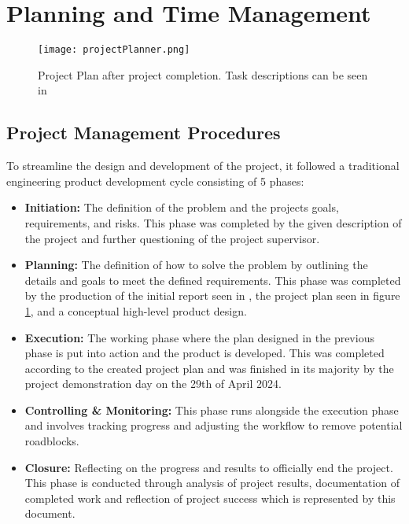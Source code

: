 \section{Planning and Time Management}
\begin{figure}[H]
	\centering
	\texttt{[image: projectPlanner.png]}
	\caption{Project Plan after project completion. Task descriptions can be seen in }
	\label{planner}
\end{figure}
\subsection{Project Management Procedures}
To streamline the design and development of the project, it followed a traditional engineering product development cycle consisting of 5 phases:
\begin{itemize}[]
	\item\textbf{Initiation:} The definition of the problem and the projects goals, requirements, and risks. This phase was completed by the given description of the project and further questioning of the project supervisor.
	\item\textbf{Planning:} The definition of how to solve the problem by outlining the details and goals to meet the defined requirements. This phase was completed by the production of the initial report seen in , the project plan seen in figure \ref{planner}, and a conceptual high-level product design. 
	\item\textbf{Execution:} The working phase where the plan designed in the previous phase is put into action and the product is developed. This was completed according to the created project plan and was finished in its majority by the project demonstration day on the 29th of April 2024.
	\item\textbf{Controlling \& Monitoring:} This phase runs alongside the execution phase and involves tracking progress and adjusting the workflow to remove potential roadblocks.
	\item\textbf{Closure:} Reflecting on the progress and results to officially end the project. This phase is conducted through analysis of project results, documentation of completed work and reflection of project success which is represented by this document.
\end{itemize}

